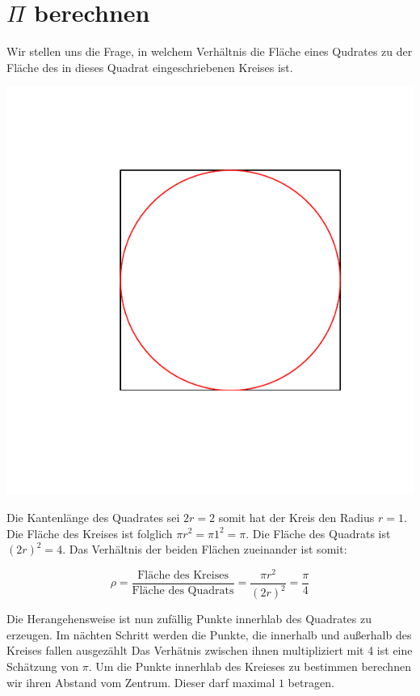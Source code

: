 
\section{$\Pi$ berechnen}

Wir stellen uns die Frage, in welchem Verhältnis die Fläche eines Qudrates zu der Fläche des in dieses Quadrat eingeschriebenen Kreises ist. 

\includegraphics{sim_pi-001}

Die Kantenlänge des Quadrates sei $2r=2$ somit hat der Kreis den Radius $r=1$. Die Fläche des Kreises ist folglich $\pi r^2 = \pi 1^2 = \pi$. Die Fläche des Quadrats ist $(2r)^2=4$. Das Verhältnis der beiden Flächen zueinander ist somit:

\begin{equation} \label{eq:pi}
  \rho = \frac{\text{Fläche des Kreises}}{\text{Fläche des Quadrats}} = \frac{\pi r^2}{(2r)^2} = \frac{\pi}{4}
\end{equation}

Die Herangehensweise ist nun zufällig Punkte innerhlab des Quadrates zu erzeugen. Im nächten Schritt werden die Punkte, die innerhalb und außerhalb des Kreises fallen ausgezählt Das Verhätnis zwischen ihnen multipliziert mit 4 ist eine Schätzung von $\pi$.
Um die Punkte innerhlab des Kreieses zu bestimmen berechnen wir ihren Abstand vom Zentrum. Dieser darf maximal $1$ betragen.

